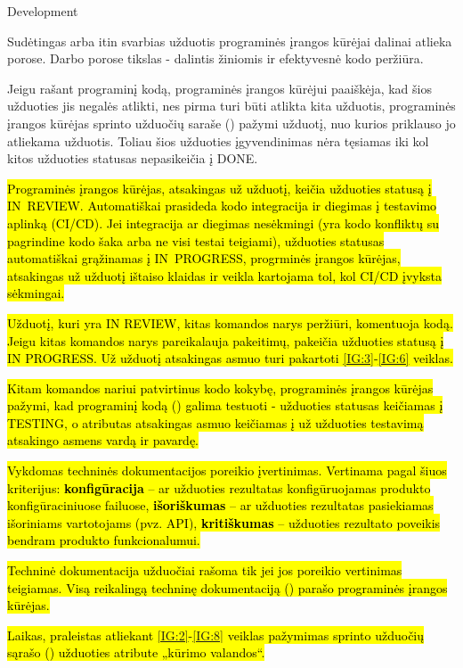 \begin{processTable}{Development}
{        \item Sudėtingas arba itin svarbias užduotis programinės įrangos kūrėjai dalinai atlieka porose. Darbo porose tikslas - dalintis žiniomis ir efektyvesnė kodo peržiūra.
        \label{IG:4}

        \item Jeigu rašant programinį kodą, programinės įrangos kūrėjui paaiškėja, kad šios užduoties jis negalės atlikti, nes pirma turi būti atlikta kita užduotis, programinės įrangos kūrėjas sprinto užduočių saraše () pažymi užduotį, nuo kurios priklauso jo atliekama užduotis. Toliau šios užduoties įgyvendinimas nėra tęsiamas iki kol kitos užduoties statusas nepasikeičia į DONE.
        \label{IG:3}

        \item \hl{Programinės įrangos kūrėjas, atsakingas už užduotį, keičia užduoties statusą į \mbox{IN~REVIEW}. Automatiškai prasideda kodo integracija ir diegimas į testavimo aplinką (CI/CD). Jei integracija ar diegimas nesėkmingi (yra kodo konfliktų su pagrindine kodo šaka arba ne visi testai teigiami), užduoties statusas automatiškai grąžinamas į \mbox{IN~PROGRESS}, progrminės įrangos kūrėjas, atsakingas už užduotį ištaiso klaidas ir veikla kartojama tol, kol CI/CD įvyksta sėkmingai.}
        \label{IG:5}

        \item \hl{Užduotį, kuri yra IN REVIEW, kitas komandos narys peržiūri, komentuoja kodą. Jeigu kitas komandos narys pareikalauja pakeitimų, pakeičia užduoties statusą į IN PROGRESS. Už užduotį atsakingas asmuo turi pakartoti \ref{IG:3}-\ref{IG:6} veiklas.}
        \label{IG:6}
        \item \hl{Kitam komandos nariui patvirtinus kodo kokybę, programinės įrangos kūrėjas pažymi, kad programinį kodą () galima testuoti - užduoties statusas keičiamas į TESTING, o atributas atsakingas asmuo  keičiamas į už užduoties testavimą atsakingo asmens vardą ir pavardę.}
        \label{IG:7}

        \item \hl{Vykdomas techninės dokumentacijos poreikio įvertinimas. Vertinama pagal šiuos kriterijus: \textbf{konfigūracija} -- ar užduoties rezultatas konfigūruojamas produkto konfigūraciniuose failuose, \textbf{išoriškumas} -- ar užduoties rezultatas pasiekiamas išoriniams vartotojams (pvz. API), \textbf{kritiškumas} -- užduoties rezultato poveikis bendram produkto funkcionalumui.}

        \item \hl{Techninė dokumentacija užduočiai rašoma tik jei jos poreikio vertinimas teigiamas. Visą reikalingą techninę dokumentaciją () parašo programinės įrangos kūrėjas.}
        \label{IG:8}

        \item \hl{Laikas, praleistas atliekant \ref{IG:2}-\ref{IG:8} veiklas pažymimas sprinto užduočių sąrašo ()  užduoties atribute  „kūrimo valandos“.}
    }
\end{processTable}

